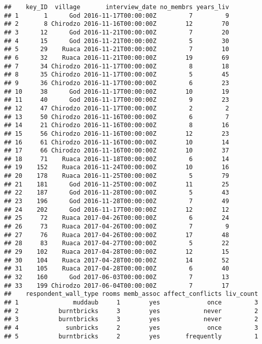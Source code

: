 \documentclass[
]{article}
\begin{document}
\begin{verbatim}
##    key_ID  village       interview_date no_membrs years_liv
## 1       1      God 2016-11-17T00:00:00Z         7         9
## 2       8 Chirodzo 2016-11-16T00:00:00Z        12        70
## 3      12      God 2016-11-21T00:00:00Z         7        20
## 4      15      God 2016-11-21T00:00:00Z         5        30
## 5      29    Ruaca 2016-11-21T00:00:00Z         7        10
## 6      32    Ruaca 2016-11-21T00:00:00Z        19        69
## 7      34 Chirodzo 2016-11-17T00:00:00Z         8        18
## 8      35 Chirodzo 2016-11-17T00:00:00Z         5        45
## 9      36 Chirodzo 2016-11-17T00:00:00Z         6        23
## 10     38      God 2016-11-17T00:00:00Z        10        19
## 11     40      God 2016-11-17T00:00:00Z         9        23
## 12     47 Chirodzo 2016-11-17T00:00:00Z         2         2
## 13     50 Chirodzo 2016-11-16T00:00:00Z         6         7
## 14     21 Chirodzo 2016-11-16T00:00:00Z         8        16
## 15     56 Chirodzo 2016-11-16T00:00:00Z        12        23
## 16     61 Chirodzo 2016-11-16T00:00:00Z        10        14
## 17     66 Chirodzo 2016-11-16T00:00:00Z        10        37
## 18     71    Ruaca 2016-11-18T00:00:00Z         6        14
## 19    152    Ruaca 2016-11-24T00:00:00Z        10        16
## 20    178    Ruaca 2016-11-25T00:00:00Z         5        79
## 21    181      God 2016-11-25T00:00:00Z        11        25
## 22    187      God 2016-11-28T00:00:00Z         5        43
## 23    196      God 2016-11-28T00:00:00Z         7        49
## 24    202      God 2016-11-17T00:00:00Z        12        12
## 25     72    Ruaca 2017-04-26T00:00:00Z         6        24
## 26     73    Ruaca 2017-04-26T00:00:00Z         7         9
## 27     76    Ruaca 2017-04-26T00:00:00Z        17        48
## 28     83    Ruaca 2017-04-27T00:00:00Z         5        22
## 29    102    Ruaca 2017-04-28T00:00:00Z        12        15
## 30    104    Ruaca 2017-04-28T00:00:00Z        14        52
## 31    105    Ruaca 2017-04-28T00:00:00Z         6        40
## 32    160      God 2017-06-03T00:00:00Z         7        13
## 33    199 Chirodzo 2017-06-04T00:00:00Z         7        17
##    respondent_wall_type rooms memb_assoc affect_conflicts liv_count
## 1               muddaub     1        yes             once         3
## 2           burntbricks     3        yes            never         2
## 3           burntbricks     3        yes            never         2
## 4             sunbricks     2        yes             once         3
## 5           burntbricks     2        yes       frequently         1

\end{verbatim}
\end{document}
